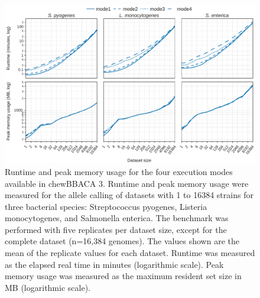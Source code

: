 \newpage
\begin{figure}[h!]
    \centering
    \includegraphics[angle=0,width=\textwidth]{figures/chapter 2/FigureS13.pdf}
    \caption{Runtime and peak memory usage for the four execution modes available in chewBBACA 3. Runtime and peak memory usage were measured for the allele calling of datasets with 1 to 16384 strains for three bacterial species: Streptococcus pyogenes, Listeria monocytogenes, and Salmonella enterica. The benchmark was performed with five replicates per dataset size, except for the complete dataset (n=16,384 genomes). The values shown are the mean of the replicate values for each dataset. Runtime was measured as the elapsed real time in minutes (logarithmic scale). Peak memory usage was measured as the maximum resident set size in MB (logarithmic scale).}
    \label{fig:chap2_figureS13}
\end{figure}

